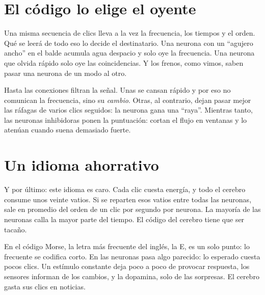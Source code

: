
\section*{El código lo elige el oyente}

Una misma secuencia de clics lleva a la vez la frecuencia, los tiempos y el orden. Qué se leerá de todo eso lo decide el destinatario. Una neurona con un “agujero ancho” en el balde acumula agua despacio y solo oye la frecuencia. Una neurona que olvida rápido solo oye las coincidencias. Y los frenos, como vimos, saben pasar una neurona de un modo al otro.

Hasta las conexiones filtran la señal. Unas se cansan rápido y por eso no comunican la frecuencia, sino su \emph{cambio}. Otras, al contrario, dejan pasar mejor las ráfagas de varios clics seguidos: la neurona gana una “raya”. Mientras tanto, las neuronas inhibidoras ponen la puntuación: cortan el flujo en ventanas y lo atenúan cuando suena demasiado fuerte.

\section*{Un idioma ahorrativo}

Y por último: este idioma es caro. Cada clic cuesta energía, y todo el cerebro consume unos veinte vatios. Si se reparten esos vatios entre todas las neuronas, sale en promedio del orden de un clic por segundo por neurona. La mayoría de las neuronas calla la mayor parte del tiempo. El código del cerebro tiene que ser tacaño.

En el código Morse, la letra más frecuente del inglés, la E, es un solo punto: lo frecuente se codifica corto. En las neuronas pasa algo parecido: lo esperado cuesta pocos clics. Un estímulo constante deja poco a poco de provocar respuesta, los sensores informan de los cambios, y la dopamina, solo de las sorpresas. El cerebro gasta sus clics en noticias.

